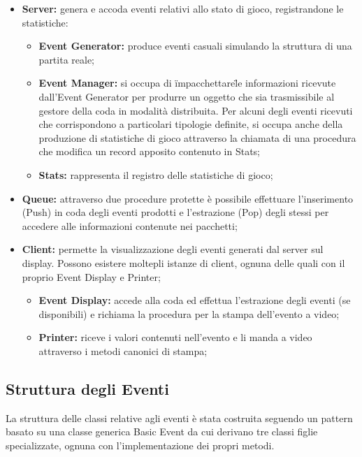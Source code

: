 \documentclass[aps,letterpaper,10pt]{article}
\begin{document}
\begin{itemize}
	\item \textbf{Server:} genera e accoda eventi relativi allo stato di gioco, registrandone le statistiche:
		\begin{itemize}
			\item \textbf{Event Generator:} produce eventi casuali simulando la struttura di una partita reale;
			\item \textbf{Event Manager:} si occupa di \"impacchettare\" le informazioni ricevute dall'Event Generator per produrre un oggetto che sia trasmissibile al gestore della coda in modalit\`a distribuita. Per alcuni degli eventi ricevuti che corrispondono a particolari tipologie definite, si occupa anche della produzione di statistiche di gioco attraverso la chiamata di una procedura che modifica un record apposito contenuto in Stats;
			\item \textbf{Stats:} rappresenta il registro delle statistiche di gioco;
		\end{itemize}
	\item \textbf{Queue:} attraverso due procedure protette \`e possibile effettuare l'inserimento (Push) in coda degli eventi prodotti e l'estrazione (Pop) degli stessi per accedere alle informazioni contenute nei pacchetti;
	\item \textbf{Client:} permette la visualizzazione degli eventi generati dal server sul display. Possono esistere moltepli istanze di client, ognuna delle quali con il proprio Event Display e Printer;
		\begin{itemize}
		\item \textbf{Event Display:} accede alla coda ed effettua l'estrazione degli eventi (se disponibili) e richiama la procedura per la stampa dell'evento a video;
		\item \textbf{Printer:} riceve i valori contenuti nell'evento e li manda a video attraverso i metodi canonici di stampa;
		\end{itemize}
\end{itemize}

\subsection{Struttura degli Eventi}

La struttura delle classi relative agli eventi \`e stata costruita seguendo un pattern basato su una classe generica Basic Event da cui derivano tre classi figlie specializzate, ognuna con l'implementazione dei propri metodi.
\end{document}
